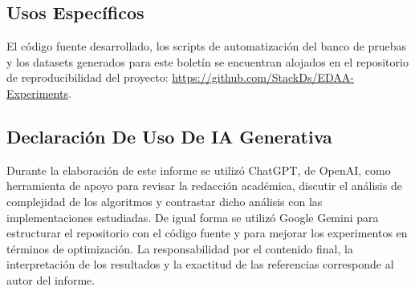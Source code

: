 \documentclass[11pt,letterpaper]{article}
\begin{document}
\subsection{Usos Específicos}

El código fuente desarrollado, los scripts de automatización del banco de pruebas y los datasets generados para este boletín se encuentran alojados en el repositorio de reproducibilidad del proyecto: \url{https://github.com/StackDs/EDAA-Experiments}.


\subsection{Declaración De Uso De IA Generativa}
Durante la elaboración de este informe se utilizó ChatGPT, de OpenAI,
como herramienta de apoyo para revisar la redacción académica,
discutir el análisis de complejidad de los algoritmos y contrastar
dicho análisis con las implementaciones estudiadas.
De igual forma se utilizó Google Gemini para estructurar el repositorio con el código fuente y para mejorar los experimentos en términos de optimización.
La responsabilidad por el contenido final, la interpretación de
los resultados y la exactitud de las referencias corresponde
al autor del informe.
\end{document}
